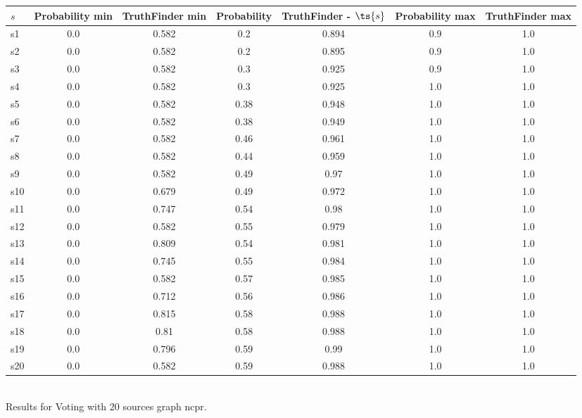 \documentclass{article}
\begin{document}
\noindent\begin{tabular}{|l|c|c|c|c|c|c|}
\hline
$s$& Probability min & TruthFinder min & Probability & TruthFinder - $\ts{s}$ & Probability max & TruthFinder max\\
\hline
s1 &0.0 & 0.582 & 0.2 & 0.894 & 0.9 & 1.0\\
\hline
s2 &0.0 & 0.582 & 0.2 & 0.895 & 0.9 & 1.0\\
\hline
s3 &0.0 & 0.582 & 0.3 & 0.925 & 0.9 & 1.0\\
\hline
s4 &0.0 & 0.582 & 0.3 & 0.925 & 1.0 & 1.0\\
\hline
s5 &0.0 & 0.582 & 0.38 & 0.948 & 1.0 & 1.0\\
\hline
s6 &0.0 & 0.582 & 0.38 & 0.949 & 1.0 & 1.0\\
\hline
s7 &0.0 & 0.582 & 0.46 & 0.961 & 1.0 & 1.0\\
\hline
s8 &0.0 & 0.582 & 0.44 & 0.959 & 1.0 & 1.0\\
\hline
s9 &0.0 & 0.582 & 0.49 & 0.97 & 1.0 & 1.0\\
\hline
s10 &0.0 & 0.679 & 0.49 & 0.972 & 1.0 & 1.0\\
\hline
s11 &0.0 & 0.747 & 0.54 & 0.98 & 1.0 & 1.0\\
\hline
s12 &0.0 & 0.582 & 0.55 & 0.979 & 1.0 & 1.0\\
\hline
s13 &0.0 & 0.809 & 0.54 & 0.981 & 1.0 & 1.0\\
\hline
s14 &0.0 & 0.745 & 0.55 & 0.984 & 1.0 & 1.0\\
\hline
s15 &0.0 & 0.582 & 0.57 & 0.985 & 1.0 & 1.0\\
\hline
s16 &0.0 & 0.712 & 0.56 & 0.986 & 1.0 & 1.0\\
\hline
s17 &0.0 & 0.815 & 0.58 & 0.988 & 1.0 & 1.0\\
\hline
s18 &0.0 & 0.81 & 0.58 & 0.988 & 1.0 & 1.0\\
\hline
s19 &0.0 & 0.796 & 0.59 & 0.99 & 1.0 & 1.0\\
\hline
s20 &0.0 & 0.582 & 0.59 & 0.988 & 1.0 & 1.0\\
\hline
\end{tabular}\\

\noindent Results for Voting with 20 sources graph ncpr.
\end{document}
